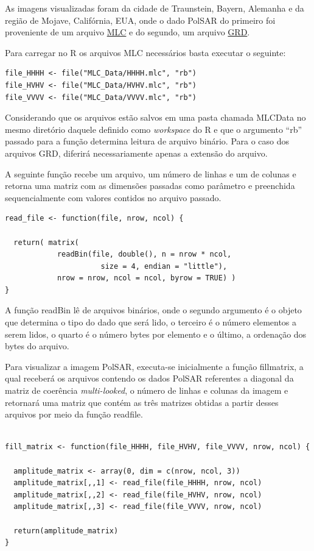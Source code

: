 \documentclass[12pt]{article}
\begin{document}
As imagens visualizadas foram da cidade de Traunstein, Bayern, Alemanha e da região de Mojave, Califórnia, EUA, onde o dado PolSAR do primeiro foi proveniente de um arquivo \href{https://uavsar.jpl.nasa.gov/cgi-bin/product.pl?jobName=trauns_22551_15087_016_150604_L090_CX_01#data}{MLC} e do segundo, um arquivo \href{https://uavsar.jpl.nasa.gov/cgi-bin/product.pl?jobName=mmmmoj_18030_17050_005_170519_PL09043020_XX_01#data
}{GRD}.

Para carregar no R os arquivos MLC necessários basta executar o seguinte:
\begin{verbatim}
file_HHHH <- file("MLC_Data/HHHH.mlc", "rb")
file_HVHV <- file("MLC_Data/HVHV.mlc", "rb")
file_VVVV <- file("MLC_Data/VVVV.mlc", "rb")
\end{verbatim}

Considerando que os arquivos estão salvos em uma pasta chamada MLC\textunderscore Data no mesmo diretório daquele definido como \textit{workspace} do R e que o argumento ``rb'' passado para a função determina leitura de arquivo binário. Para o caso dos arquivos GRD, diferirá necessariamente apenas a extensão do arquivo.

A seguinte função recebe um arquivo, um número de linhas e um de colunas e retorna uma matriz com as dimensões passadas como parâmetro e preenchida sequencialmente com valores contidos no arquivo passado. 

\begin{verbatim}
read_file <- function(file, nrow, ncol) {

  return( matrix(
            readBin(file, double(), n = nrow * ncol, 
                      size = 4, endian = "little"), 
            nrow = nrow, ncol = ncol, byrow = TRUE) )
}
\end{verbatim}
A função readBin lê de arquivos binários, onde o segundo argumento é o objeto que determina o tipo do dado que será lido, o terceiro é o número elementos a serem lidos, o quarto é o número bytes por elemento e o último, a ordenação dos bytes do arquivo. 

Para visualizar a imagem PolSAR, executa-se inicialmente a função fill\textunderscore matrix, a qual receberá os arquivos contendo os dados PolSAR referentes a diagonal da matriz de coerência \textit{multi-looked}, o número de linhas e colunas da imagem e retornará uma matriz que contém as três matrizes obtidas a partir desses arquivos por meio da função read\textunderscore file.

\begin{verbatim}

fill_matrix <- function(file_HHHH, file_HVHV, file_VVVV, nrow, ncol) {
  
  amplitude_matrix <- array(0, dim = c(nrow, ncol, 3))
  amplitude_matrix[,,1] <- read_file(file_HHHH, nrow, ncol)
  amplitude_matrix[,,2] <- read_file(file_HVHV, nrow, ncol)
  amplitude_matrix[,,3] <- read_file(file_VVVV, nrow, ncol)
  
  return(amplitude_matrix) 
}
\end{verbatim}
\end{document}
